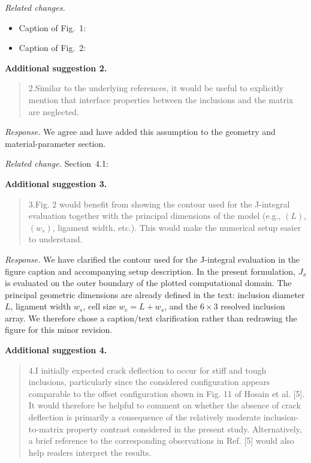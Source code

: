 \documentclass[a4paper,11pt]{article}
\newenvironment{ReviewerComment}{\begin{quote}\small}{\end{quote}}
\begin{document}
\emph{Related changes.}
\begin{itemize}
  \item Caption of Fig.~1: 
  \item Caption of Fig.~2: 
\end{itemize}

\textbf{Additional suggestion 2.}
\begin{ReviewerComment}
2.Similar to the underlying references, it would be useful to
explicitly mention that interface properties between the inclusions
and the matrix are neglected.
\end{ReviewerComment}

\emph{Response.} We agree and have added this assumption to the
geometry and material-parameter section.

\emph{Related change.} Section~4.1:
\begin{quote}
\end{quote}

\textbf{Additional suggestion 3.}
\begin{ReviewerComment}
3.Fig. 2 would benefit from showing the contour used for the
J-integral evaluation together with the principal dimensions of the
model (e.g., \((L)\), \((w_s)\), ligament width, etc.). This would
make the numerical setup easier to understand.
\end{ReviewerComment}

\emph{Response.} We have clarified the contour used for the
J-integral evaluation in the figure caption and accompanying setup
description. In the present formulation, \(J_x\) is evaluated on the
outer boundary of the plotted computational domain. The principal
geometric dimensions are already defined in the text: inclusion
diameter \(L\), ligament width \(w_s\), cell size
\(w_c=L+w_s\), and the \(6\times3\) resolved inclusion array. We
therefore chose a caption/text clarification rather than redrawing
the figure for this minor revision.

\textbf{Additional suggestion 4.}
\begin{ReviewerComment}
4.I initially expected crack deflection to occur for stiff and tough
inclusions, particularly since the considered configuration appears
comparable to the offset configuration shown in Fig. 11 of Hosain et
al. [5]. It would therefore be helpful to comment on whether the
absence of crack deflection is primarily a consequence of the
relatively moderate inclusion-to-matrix property contrast considered
in the present study. Alternatively, a brief reference to the
corresponding observations in Ref. [5] would also help readers
interpret the results.
\end{ReviewerComment}
\end{document}

